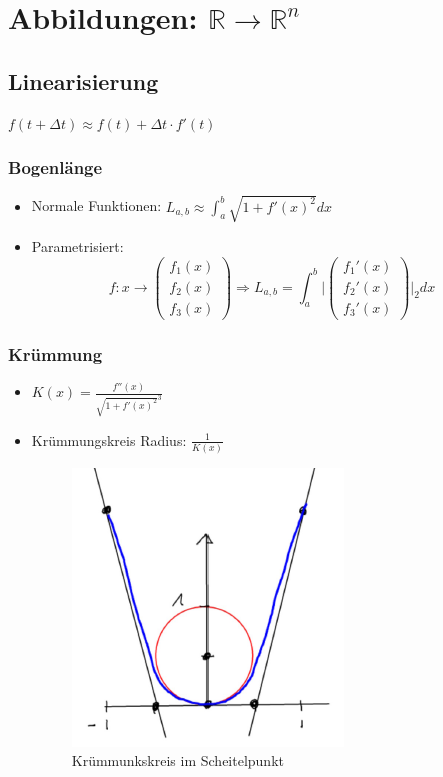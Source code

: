 \section{Abbildungen: $\mathbb{R} \rightarrow \mathbb{R}^n$}

\subsection{Linearisierung}
$f(t+\Delta t) \approx f(t) + \Delta t \cdot f'(t)$

\subsubsection{Bogenlänge}
\begin{itemize}
	\item Normale Funktionen: $L_{a,b} \approx \int_a^b \sqrt{1+f'(x)^2} dx$
	\item Parametrisiert: \\
	\begin{displaymath}
		f: x \rightarrow
		\begin{pmatrix}
			f_1(x) \\ f_2(x) \\ f_3(x)
		\end{pmatrix}
		\Rightarrow
		L_{a,b} = \int_a^b \bigg |
		\begin{pmatrix}
			f_1'(x) \\ f_2'(x) \\ f_3'(x)
		\end{pmatrix}
		\bigg |_2 dx
	\end{displaymath}
\end{itemize}

\subsubsection{Krümmung}
\begin{itemize}
	\item $K(x) = \frac{f''(x)}{\sqrt{1+f'(x)^2}^3}$
	\item Krümmungskreis Radius: $\frac{1}{K(x)}$ \\
	\begin{figure}[h!]
		\centering
		\includegraphics[scale=.5]{pics/kruemmungskreis}
		\caption{Krümmunkskreis im Scheitelpunkt}
	\end{figure}
\end{itemize}
